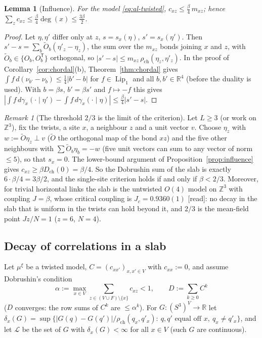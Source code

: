 \documentclass[11pt,a4paper]{article}
\theoremstyle{remark}
\theoremstyle{definition}
\theoremstyle{plain}
\newtheorem{allem}[althm]{Lemma}
\theoremstyle{remark}
\newtheorem{alrem}[althm]{Remark}
\newcommand{\R}{\mathbb{R}}
\newcommand{\Z}{\mathbb{Z}}
\newcommand{\st}[1]{\textsf{[#1]}}
\newcommand{\Dch}{D_{\mathrm{ch}}}
\newcommand{\rch}{\rho_{\mathrm{ch}}}
\begin{document}
\begin{allem}[Influence]\label{lem:al-influence}
For the model \eqref{eq:al-twisted}, $c_{xz}\le\frac\beta4\,m_{xz}$; hence $\sum_zc_{xz}\le\frac\beta4\deg(x)\le\frac{3\beta}2$.
\end{allem}
\begin{proof}
Let $\eta,\eta'$ differ only at $z$, $s=s_x(\eta)$, $s'=s_x(\eta')$. Then $s'-s=\sum_b\tilde O_b(\eta'_z-\eta_z)$, the sum over the $m_{xz}$ bonds joining $x$ and $z$, with $\tilde O_b\in\{O_b,O_b^{\mathsf T}\}$ orthogonal, so $|s'-s|\le m_{xz}\,\rch(\eta_z,\eta'_z)$. In the proof of Corollary~\ref{cor:chordal}(b), Theorem~\ref{thm:chordal} gives $\int f\,d(\nu_{b'}-\nu_b)\le\frac14|b'-b|$ for $f\in\operatorname{Lip}_1$ and all $b,b'\in\R^4$ (before the duality is used). With $b=\beta s$, $b'=\beta s'$ and $f\mapsto-f$ this gives $|\int f\,d\gamma_x(\cdot\mid\eta')-\int f\,d\gamma_x(\cdot\mid\eta)|\le\frac\beta4|s'-s|$.
\end{proof}

\begin{alrem}[The threshold $2/3$ is the limit of the criterion]\label{rem:al-ceiling}
Let $L\ge3$ (or work on $\Z^3$), fix the twists, a site $x$, a neighbour $z$ and a unit vector $v$. Choose $\eta_z$ with $w:=\tilde O\eta_z\perp v$ ($\tilde O$ the orthogonal map of the bond $xz$) and the five other neighbours with $\sum\tilde O_b\eta_b=-w$ (five unit vectors can sum to any vector of norm $\le5$), so that $s_x=0$. The lower-bound argument of Proposition~\ref{prop:influence} gives $c_{xz}\ge\beta\Dch(0)=\beta/4$. So the Dobrushin sum of the slab is exactly $6\cdot\beta/4=3\beta/2$, and the single-site criterion holds if and only if $\beta<2/3$. Moreover, for trivial horizontal links the slab is the untwisted $O(4)$ model on $\Z^3$ with coupling $J=\beta$, whose critical coupling is $J_c=0.9360(1)$ \cite{KK95} \st{read}: no decay in the slab that is uniform in the twists can hold beyond it, and $2/3$ is the mean-field point $Jz/N=1$ ($z=6$, $N=4$).
\end{alrem}

\subsection{Decay of correlations in a slab}\label{sec:slabdecay}

Let $\mu^\xi$ be a twisted model, $C=(c_{xx'})_{x,x'\in V}$ with $c_{xx}:=0$, and assume Dobrushin's condition
\begin{equation}\label{eq:al-dob}
\alpha:=\max_{x\in V}\sum_{z\in(V\cup F)\setminus\{x\}}c_{xz}<1,\qquad D:=\sum_{k\ge0}C^k
\end{equation}
($D$ converges: the row sums of $C^k$ are $\le\alpha^k$). For $G:(S^3)^V\to\R$ let $\delta_x(G)=\sup\{|G(q)-G(q')|/\rch(q_x,q'_x):\ q,q'\text{ equal off }x,\ q_x\ne q'_x\}$, and let $\mathcal L$ be the set of $G$ with $\delta_x(G)<\infty$ for all $x\in V$ (such $G$ are continuous).
\end{document}
